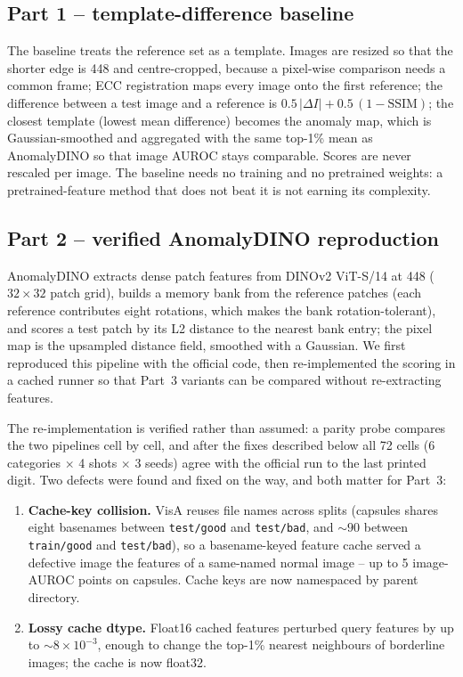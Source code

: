 \subsection{Part 1 -- template-difference baseline}
\label{sec:method-part1}

The baseline treats the reference set as a template. Images are resized so that the shorter
edge is 448 and centre-cropped, because a pixel-wise comparison needs a common frame; ECC
registration maps every image onto the first reference; the difference between a test image
and a reference is $0.5\,|\Delta I| + 0.5\,(1 - \mathrm{SSIM})$; the closest template (lowest
mean difference) becomes the anomaly map, which is Gaussian-smoothed and aggregated with the
same top-1\% mean as AnomalyDINO so that image AUROC stays comparable. Scores are never
rescaled per image. The baseline needs no training and no pretrained weights: a
pretrained-feature method that does not beat it is not earning its complexity.

\subsection{Part 2 -- verified AnomalyDINO reproduction}
\label{sec:method-part2}

AnomalyDINO extracts dense patch features from DINOv2 ViT-S/14 at 448 ($32\times32$ patch
grid), builds a memory bank from the reference patches (each reference contributes eight
rotations, which makes the bank rotation-tolerant), and scores a test patch by its L2
distance to the nearest bank entry; the pixel map is the upsampled distance field, smoothed
with a Gaussian. We first reproduced this pipeline with the official code, then
re-implemented the scoring in a cached runner so that Part~3 variants can be compared without
re-extracting features.

The re-implementation is verified rather than assumed: a parity probe compares the two
pipelines cell by cell, and after the fixes described below all 72 cells (6 categories
$\times$ 4 shots $\times$ 3 seeds) agree with the official run to the last printed digit.
Two defects were found and fixed on the way, and both matter for Part~3:
\begin{enumerate}
  \item \textbf{Cache-key collision.} VisA reuses file names across splits (capsules shares
        eight basenames between \texttt{test/good} and \texttt{test/bad}, and ${\sim}90$
        between \texttt{train/good} and \texttt{test/bad}), so a basename-keyed feature
        cache served a defective image the features of a same-named normal image -- up to
        5 image-AUROC points on capsules. Cache keys are now namespaced by parent directory.
  \item \textbf{Lossy cache dtype.} Float16 cached features perturbed query features by up
        to ${\sim}8\times10^{-3}$, enough to change the top-1\% nearest neighbours of
        borderline images; the cache is now float32.
\end{enumerate}

